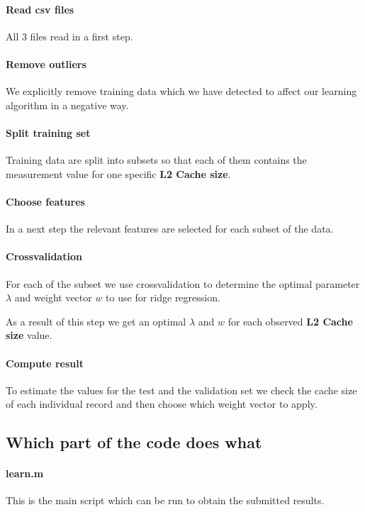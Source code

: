 \documentclass[a4paper, 11pt]{article}
\begin{document}
\paragraph{Read csv files}
All 3 files read in a first step.

\paragraph{Remove outliers}
We explicitly remove training data which we have detected to affect our learning algorithm in a negative way.

\paragraph{Split training set}
Training data are split into subsets so that each of them contains the measurement value for one specific \textbf{L2 Cache size}.

\paragraph{Choose features}
In a next step the relevant features are selected for each subset of the data.

\paragraph{Crossvalidation}
For each of the subset we use crossvalidation to determine the optimal parameter $\lambda$ and weight vector $w$ to use for ridge regression.

As a result of this step we get an optimal $\lambda$ and $w$ for each observed \textbf{L2 Cache size} value.

\paragraph{Compute result}
To estimate the values for the test and the validation set we check the cache size of each individual record and then choose which weight vector to apply.

\subsection{Which part of the code does what}

\paragraph{learn.m}
This is the main script which can be run to obtain the submitted results.
\end{document}
